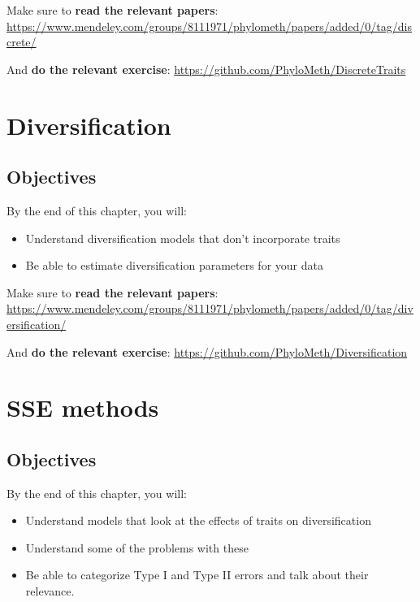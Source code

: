 \documentclass[]{book}
\providecommand{\tightlist}{%
  \setlength{\itemsep}{0pt}\setlength{\parskip}{0pt}}
\theoremstyle{definition}
\theoremstyle{definition}
\theoremstyle{remark}
\begin{document}
Make sure to \textbf{read the relevant papers}:
\url{https://www.mendeley.com/groups/8111971/phylometh/papers/added/0/tag/discrete/}

And \textbf{do the relevant exercise}:
\url{https://github.com/PhyloMeth/DiscreteTraits}

\hypertarget{diversification}{\chapter{Diversification}\label{diversification}}

\section{Objectives}\label{objectives-3}

By the end of this chapter, you will:

\begin{itemize}
\tightlist
\item
  Understand diversification models that don't incorporate traits
\item
  Be able to estimate diversification parameters for your data
\end{itemize}

Make sure to \textbf{read the relevant papers}:
\url{https://www.mendeley.com/groups/8111971/phylometh/papers/added/0/tag/diversification/}

And \textbf{do the relevant exercise}:
\url{https://github.com/PhyloMeth/Diversification}

\chapter{SSE methods}\label{sse-methods}

\section{Objectives}\label{objectives-4}

By the end of this chapter, you will:

\begin{itemize}
\tightlist
\item
  Understand models that look at the effects of traits on
  diversification
\item
  Understand some of the problems with these
\item
  Be able to categorize Type I and Type II errors and talk about their
  relevance.
\end{itemize}
\end{document}
